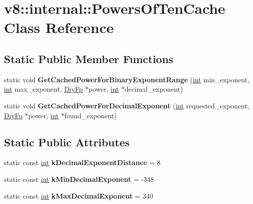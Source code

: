 \hypertarget{classv8_1_1internal_1_1PowersOfTenCache}{}\section{v8\+:\+:internal\+:\+:Powers\+Of\+Ten\+Cache Class Reference}
\label{classv8_1_1internal_1_1PowersOfTenCache}
\subsection*{Static Public Member Functions}
\begin{DoxyCompactItemize}
\item 
\mbox{\label{classv8_1_1internal_1_1PowersOfTenCache_a6540b66a9cbfa1a641495b4210e48980}} 
static void {\bfseries Get\+Cached\+Power\+For\+Binary\+Exponent\+Range} (\mbox{\hyperlink{classint}{int}} min\+\_\+exponent, \mbox{\hyperlink{classint}{int}} max\+\_\+exponent, \mbox{\hyperlink{classv8_1_1internal_1_1DiyFp}{Diy\+Fp}} $\ast$power, \mbox{\hyperlink{classint}{int}} $\ast$decimal\+\_\+exponent)
\item 
\mbox{\label{classv8_1_1internal_1_1PowersOfTenCache_ab5f115d74ae1d59957740e6b32e7be35}} 
static void {\bfseries Get\+Cached\+Power\+For\+Decimal\+Exponent} (\mbox{\hyperlink{classint}{int}} requested\+\_\+exponent, \mbox{\hyperlink{classv8_1_1internal_1_1DiyFp}{Diy\+Fp}} $\ast$power, \mbox{\hyperlink{classint}{int}} $\ast$found\+\_\+exponent)
\end{DoxyCompactItemize}
\subsection*{Static Public Attributes}
\begin{DoxyCompactItemize}
\item 
\mbox{\label{classv8_1_1internal_1_1PowersOfTenCache_a329c4f9bb31d4843a1c78de73c1b46a2}} 
static const \mbox{\hyperlink{classint}{int}} {\bfseries k\+Decimal\+Exponent\+Distance} = 8
\item 
\mbox{\label{classv8_1_1internal_1_1PowersOfTenCache_a0da8d97277aecd957197313bb1e9cc63}} 
static const \mbox{\hyperlink{classint}{int}} {\bfseries k\+Min\+Decimal\+Exponent} = -\/348
\item 
\mbox{\label{classv8_1_1internal_1_1PowersOfTenCache_a5e7db658341c32ff29a88f3b893ad20e}} 
static const \mbox{\hyperlink{classint}{int}} {\bfseries k\+Max\+Decimal\+Exponent} = 340
\end{DoxyCompactItemize}


